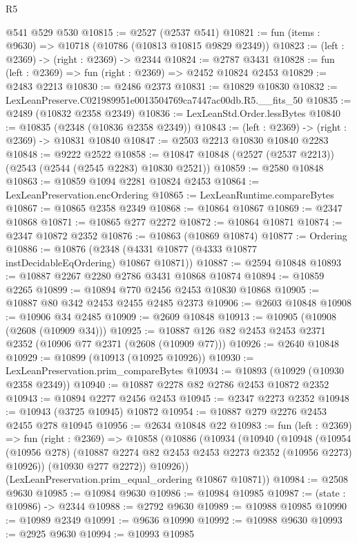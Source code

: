 \begin{lexlean}{R5}
\begin{coremodule}
    @541
    @529
    @530
@10815 := @2527 (@2537 @541)
@10821 := fun (items : @9630) => @10718 (@10786 (@10813 @10815 @9829 @2349))
@10823 := (left : @2369) -> (right : @2369) -> @2344
@10824 := @2787 @3431
@10828 := fun (left : @2369) => fun (right : @2369) => @2452 @10824 @2453
@10829 := @2483 @2213
@10830 := @2486 @2373
@10831 := @10829 @10830
@10832 := LexLeanPreserve.C021989951e0013504769ca7447ac00db.R5.__fits_50
@10835 := @2489 (@10832 @2358 @2349)
@10836 := LexLeanStd.Order.lessBytes
@10840 := @10835 (@2348 (@10836 @2358 @2349))
@10843 := (left : @2369) -> (right : @2369) -> @10831 @10840
@10847 := @2503 @2213 @10830 @10840 @2283
@10848 := @9222 @2522
@10858 := @10847 @10848 (@2527 (@2537 @2213)) (@2543 (@2544 (@2545 @2283) @10830 @2521))
@10859 := @2580 @10848
@10863 := @10859 @1094 @2281 @10824 @2453
@10864 := LexLeanPreservation.encOrdering
@10865 := LexLeanRuntime.compareBytes
@10867 := @10865 @2358 @2349
@10868 := @10864 @10867
@10869 := @2347 @10868
@10871 := @10865 @277 @2272
@10872 := @10864 @10871
@10874 := @2347 @10872 @2352
@10876 := @10863 (@10869 @10874)
@10877 := Ordering
@10886 := @10876 (@2348 (@4331 @10877 (@4333 @10877 instDecidableEqOrdering) @10867 @10871))
@10887 := @2594 @10848
@10893 := @10887 @2267 @2280 @2786 @3431 @10868 @10874
@10894 := @10859 @2265
@10899 := @10894 @770 @2456 @2453 @10830 @10868
@10905 := @10887 @80 @342 @2453 @2455 @2485 @2373
@10906 := @2603 @10848
@10908 := @10906 @34 @2485
@10909 := @2609 @10848
@10913 := @10905 (@10908 (@2608 (@10909 @34)))
@10925 := @10887 @126 @82 @2453 @2453 @2371 @2352 (@10906 @77 @2371 (@2608 (@10909 @77)))
@10926 := @2640 @10848
@10929 := @10899 (@10913 (@10925 @10926))
@10930 := LexLeanPreservation.prim_compareBytes
@10934 := @10893 (@10929 (@10930 @2358 @2349))
@10940 := @10887 @2278 @82 @2786 @2453 @10872 @2352
@10943 := @10894 @2277 @2456 @2453
@10945 := @2347 @2273 @2352
@10948 := @10943 (@3725 @10945) @10872
@10954 := @10887 @279 @2276 @2453 @2455 @278 @10945
@10956 := @2634 @10848 @22
@10983 := fun (left : @2369) =>
  fun (right : @2369) =>
  @10858
    (@10886
      (@10934
        (@10940
          (@10948
            (@10954 (@10956 @278) (@10887 @2274 @82 @2453 @2453 @2273 @2352 (@10956 @2273) @10926))
            (@10930 @277 @2272))
          @10926))
      (LexLeanPreservation.prim_equal_ordering @10867 @10871))
@10984 := @2508 @9630
@10985 := @10984 @9630
@10986 := @10984 @10985
@10987 := (state : @10986) -> @2344
@10988 := @2792 @9630
@10989 := @10988 @10985
@10990 := @10989 @2349
@10991 := @9636 @10990
@10992 := @10988 @9630
@10993 := @2925 @9630
@10994 := @10993 @10985

\end{coremodule}
\end{lexlean}
